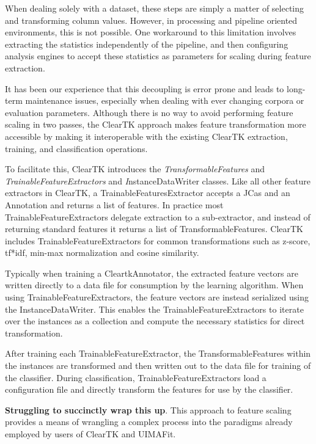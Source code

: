 \documentclass[10pt, a4paper]{article}
\begin{document}
When dealing solely with a dataset, these steps are simply a matter of selecting and transforming column values.  However, in processing and pipeline oriented environments, this is not possible.  One workaround to this limitation involves extracting the statistics independently of the pipeline, and then configuring analysis engines to accept these statistics as parameters for scaling during feature extraction.

It has been our experience that this decoupling is error prone and leads to long-term maintenance issues, especially when dealing with ever changing corpora or evaluation parameters.  Although there is no way to avoid performing feature scaling in two passes, the ClearTK approach makes feature transformation more accessible by making it interoperable with the existing ClearTK extraction, training, and classification operations.

To facilitate this, ClearTK introduces the \emph{TransformableFeatures} and \emph{TrainableFeatureExtractors} and {\emph InstanceDataWriter} classes.  Like all other feature extractors in ClearTK, a TrainableFeaturesExtractor accepts a JCas and an Annotation and returns a list of features.  In practice most TrainableFeatureExtractors delegate extraction to a sub-extractor, and instead of returning standard features it returns a list of TransformableFeatures.  ClearTK includes TrainableFeatureExtractors for common transformations such as z-score, tf*idf, min-max normalization and cosine similarity.

Typically when training a CleartkAnnotator, the extracted feature vectors are written directly to a data file for consumption by the learning algorithm.  When using TrainableFeatureExtractors, the feature vectors are instead serialized using the InstanceDataWriter.  This enables the TrainableFeatureExtractors to iterate over the instances as a collection and compute the necessary statistics for direct transformation.

After training each TrainableFeatureExtractor, the TransformableFeatures within the instances are transformed and then written out to the data file for training of the classifier.
During classification, TrainableFeatureExtractors load a configuration file and directly transform the features for use by the classifier.

\textbf{Struggling to succinctly wrap this up}.  This approach to feature scaling provides a means of wrangling a complex process into the paradigms already employed by users of ClearTK and UIMAFit.
\end{document}
